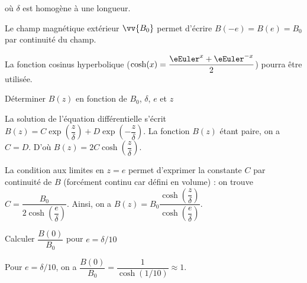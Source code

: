 où $\delta$ est homogène à une longueur.

Le champ magnétique extérieur $\vv{B_0}$ permet d'écrire  $B(-e)=B(e)=B_{0}$ par continuité du champ. 

La fonction cosinus hyperbolique ($\cosh(x)=\dfrac{\eEuler^x+\eEuler^{-x}}{2}$)
pourra être utilisée. 
                             

\begin{enonce}
Déterminer $B(z)$ en fonction de $B_0$, $\delta$, $e$ et $z$
\end{enonce}


\begin{corrige}
La solution de l'équation différentielle s'écrit $B(z)=C\exp\left(\dfrac{z}{\delta}\right)+D\exp\left(-\dfrac{z}{\delta}\right)$.
La fonction $B(z)$ étant paire, on a $C=D$. D'où $B(z)=2C\cosh\left(\dfrac{z}{\delta}\right)$.

La condition aux limites en $z=e$ permet d'exprimer la constante $C$ par continuité de $B$ (forcément continu car défini en volume) : on trouve $C=\dfrac{B_{0}}{2\cosh\left(\dfrac{e}{\delta}\right)}$. Ainsi, on a $B(z)=B_{0}\dfrac{\cosh\left(\dfrac{z}{\delta}\right)}{\cosh\left(\dfrac{e}{\delta}\right)}$.
\end{corrige}




\begin{enonce}
Calculer $\dfrac{B(0)}{B_{0}}$ pour $e=\delta/10$
\end{enonce}


\begin{corrige} 
Pour $e=\delta/10$, on a $\dfrac{B(0)}{B_{0}}=\dfrac{1}{\cosh(1/10)} \approx 1$.
\end{corrige}




